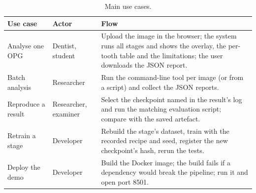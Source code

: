 \begin{table}[!htbp]
\centering
\caption[Main use cases]{Main use cases.}
\label{tab:usecases}
\small
\begin{tabularx}{\textwidth}{@{}L{3.3cm}L{2.6cm}Y@{}}
\toprule
Use case & Actor & Flow\\
\midrule
Analyse one OPG & Dentist, student & Upload the image in the browser; the system runs all stages and shows the overlay, the per-tooth table and the limitations; the user downloads the JSON report.\\
Batch analysis & Researcher & Run the command-line tool per image (or from a script) and collect the JSON reports.\\
Reproduce a result & Researcher, examiner & Select the checkpoint named in the result's log and run the matching evaluation script; compare with the saved artefact.\\
Retrain a stage & Developer & Rebuild the stage's dataset, train with the recorded recipe and seed, register the new checkpoint's hash, rerun the tests.\\
Deploy the demo & Developer & Build the Docker image; the build fails if a dependency would break the pipeline; run it and open port 8501.\\
\bottomrule
\end{tabularx}
\end{table}
